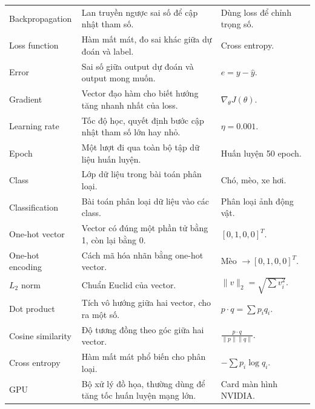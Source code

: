 \begin{longtable}{p{}p{}p{}}
Backpropagation & Lan truyền ngược sai số để cập nhật tham số. & Dùng loss để chỉnh trọng số. \\

Loss function & Hàm mất mát, đo sai khác giữa dự đoán và label. & Cross entropy. \\

Error & Sai số giữa output dự đoán và output mong muốn. & $e=y-\hat{y}$. \\

Gradient & Vector đạo hàm cho biết hướng tăng nhanh nhất của loss. & $\nabla_\theta J(\theta)$. \\

Learning rate & Tốc độ học, quyết định bước cập nhật tham số lớn hay nhỏ. & $\eta=0.001$. \\

Epoch & Một lượt đi qua toàn bộ tập dữ liệu huấn luyện. & Huấn luyện 50 epoch. \\

Class & Lớp dữ liệu trong bài toán phân loại. & Chó, mèo, xe hơi. \\

Classification & Bài toán phân loại dữ liệu vào các class. & Phân loại ảnh động vật. \\

One-hot vector & Vector có đúng một phần tử bằng 1, còn lại bằng 0. & $[0,1,0,0]^T$. \\

One-hot encoding & Cách mã hóa nhãn bằng one-hot vector. & Mèo $\rightarrow [0,1,0,0]^T$. \\

$L_2$ norm & Chuẩn Euclid của vector. & $\|v\|_2=\sqrt{\sum v_i^2}$. \\

Dot product & Tích vô hướng giữa hai vector, cho ra một số. & $p\cdot q=\sum p_iq_i$. \\

Cosine similarity & Độ tương đồng theo góc giữa hai vector. & $\frac{p\cdot q}{\|p\|\|q\|}$. \\

Cross entropy & Hàm mất mát phổ biến cho phân loại. & $-\sum p_i\log q_i$. \\

GPU & Bộ xử lý đồ họa, thường dùng để tăng tốc huấn luyện mạng lớn. & Card màn hình NVIDIA. \\

\bottomrule
\end{longtable}
\normalsize


